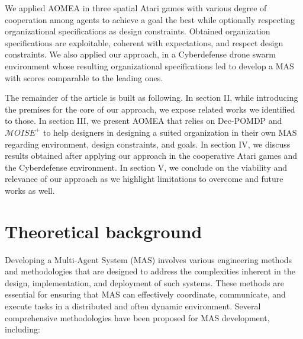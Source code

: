 \documentclass[runningheads]{llncs}
\begin{document}

We applied AOMEA in three spatial Atari games with various degree of cooperation among agents to achieve a goal the best while optionally respecting organizational specifications as design constraints. Obtained organization specifications are exploitable, coherent with expectations, and respect design constraints. We also applied our approach, in a Cyberdefense drone swarm environment whose resulting organizational specifications led to develop a MAS with scores comparable to the leading ones.

The remainder of the article is built as following.
In section II, while introducing the premises for the core of our approach, we expose related works we identified to those.
In section III, we present AOMEA that relies on Dec-POMDP and $\mathcal{M}OISE^+$ to help designers in designing a suited organization in their own MAS regarding environment, design constraints, and goals.
In section IV, we discuss results obtained after applying our approach in the cooperative Atari games and the Cyberdefense environment.
In section V, we conclude on the viability and relevance of our approach as we highlight limitations to overcome and future works as well.


\section{Theoretical background}







Developing a Multi-Agent System (MAS) involves various engineering methods and methodologies that are designed to address the complexities inherent in the design, implementation, and deployment of such systems. These methods are essential for ensuring that MAS can effectively coordinate, communicate, and execute tasks in a distributed and often dynamic environment.
Several comprehensive methodologies have been proposed for MAS development, including:
\end{document}
